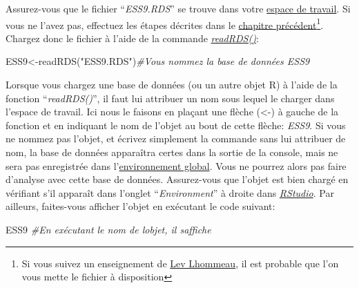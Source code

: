 \documentclass[
]{book}
\newenvironment{Shaded}{\begin{snugshade}}{\end{snugshade}}
\newcommand{\CommentTok}[1]{\textcolor[rgb]{0.56,0.35,0.01}{\textit{#1}}}
\newcommand{\FunctionTok}[1]{\textcolor[rgb]{0.00,0.00,0.00}{#1}}
\newcommand{\NormalTok}[1]{#1}
\newcommand{\OtherTok}[1]{\textcolor[rgb]{0.56,0.35,0.01}{#1}}
\newcommand{\StringTok}[1]{\textcolor[rgb]{0.31,0.60,0.02}{#1}}
\begin{document}
Assurez-vous que le fichier ``\emph{ESS9.RDS}'' se trouve dans votre \protect\hyperlink{working_directory}{espace de travail}. Si vous ne l'avez pas, effectuez les étapes décrites dans le \protect\hyperlink{import_donnees}{chapitre précédent}\footnote{Si vous suivez un enseignement de \href{mailto:lhommeau@gmail.com}{Lev Lhommeau}, il est probable que l'on vous mette le fichier à disposition}. Chargez donc le fichier à l'aide de la commande \href{https://www.rdocumentation.org/packages/base/versions/3.6.2/topics/readRDS}{\emph{readRDS()}}:

\begin{Shaded}
\begin{Highlighting}[]
\NormalTok{ESS9}\OtherTok{\textless{}{-}}\FunctionTok{readRDS}\NormalTok{(}\StringTok{"ESS9.RDS"}\NormalTok{)}\CommentTok{\#Vous nommez la base de données ESS9}
\end{Highlighting}
\end{Shaded}

Lorsque vous chargez une base de données (ou un autre objet R) à l'aide de la fonction ``\emph{readRDS()}'', il faut lui attribuer un nom sous lequel le charger dans l'espace de travail. Ici nous le faisons en plaçant une flèche (\textless-) à gauche de la fonction et en indiquant le nom de l'objet au bout de cette flèche: \emph{ESS9}. Si vous ne nommez pas l'objet, et écrivez simplement la commande sans lui attribuer de nom, la base de données apparaîtra certes dans la sortie de la console, mais ne sera pas enregistrée dans l'\protect\hyperlink{objets_envir}{environnement global}. Vous ne pourrez alors pas faire d'analyse avec cette base de données. Assurez-vous que l'objet est bien chargé en vérifiant s'il apparaît dans l'onglet ``\emph{Environment}'' à droite dans \href{https://posit.co/}{\emph{RStudio}}. Par ailleurs, faites-vous afficher l'objet en exécutant le code suivant:

\begin{Shaded}
\begin{Highlighting}[]
\NormalTok{ESS9 }\CommentTok{\#En exécutant le nom de l\textquotesingle{}objet, il s\textquotesingle{}affiche}
\end{Highlighting}
\end{Shaded}
\end{document}
